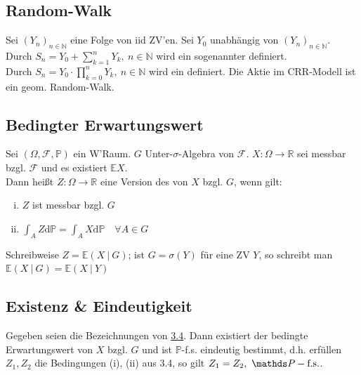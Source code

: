 
\subsection{Random-Walk}
\label{sub:random_walk}
Sei $(Y_n)_{n\in \mathds{N}}$ eine Folge von iid ZV'en. Sei $Y_0$ unabhängig von $(Y_n)_{n\in \mathds{N}}$.\\
Durch $S_n=Y_0+\sum_{k=1}^{n}Y_k,~n\in \mathds{N}$ wird ein sogenannter  definiert.\\
Durch $S_n=Y_0\cdot \prod_{k=0}^{n}Y_k,~n\in \mathds{N}$ wird ein  definiert. Die Aktie im CRR-Modell ist ein geom. Random-Walk.

\newpage
\subsection{Bedingter Erwartungswert}
\label{sub:bed_ew}
Sei $(\Omega,\mathcal{F},\mathds{P})$ ein W'Raum. $G$ Unter-$\sigma$-Algebra von $\mathcal{F}$. $X:\Omega\to \mathds{R}$ sei messbar bzgl. $\mathcal{F}$ und es existiert  $\mathds{E}X$.\\
Dann heißt $Z:\Omega\to\mathds{R}$ eine Version des  von $X$ bzgl. $G$, wenn gilt:\\
\begin{enumerate}[(i)]
	\item $Z$ ist messbar bzgl. $G$
	\item $\int_{A}Z\mathrm{d}\mathds{P}=\int_{A}X\mathrm{d}\mathds{P}\quad \forall A\in G$
\end{enumerate}
Schreibweise $Z=\mathds{E}(X~|~G)$; 
ist $G=\sigma(Y)$ für eine ZV $Y$, so schreibt man $\mathds{E}(X~|~G)=\mathds{E}(X~|~Y)$


\subsection{Existenz \& Eindeutigkeit}
\label{sub:ex&eind}
Gegeben seien die Bezeichnungen von \hyperref[sub:bed_ew]{3.4}. Dann existiert der bedingte Erwartungswert von $X$ bzgl. $G$ und ist $\mathds{P}$-f.s. eindeutig bestimmt, d.h. erfüllen $Z_1,Z_2$ die Bedingungen (i), (ii) aus 3.4, so gilt $Z_1=Z_2,~\pfs$.\\

